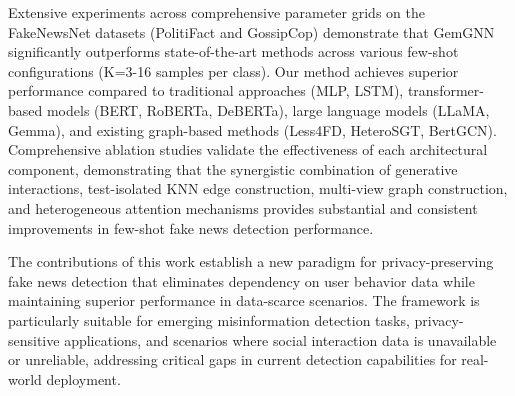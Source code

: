 
Extensive experiments across comprehensive parameter grids on the FakeNewsNet datasets (PolitiFact and GossipCop) demonstrate that GemGNN significantly outperforms state-of-the-art methods across various few-shot configurations (K=3-16 samples per class). Our method achieves superior performance compared to traditional approaches (MLP, LSTM), transformer-based models (BERT, RoBERTa, DeBERTa), large language models (LLaMA, Gemma), and existing graph-based methods (Less4FD, HeteroSGT, BertGCN). Comprehensive ablation studies validate the effectiveness of each architectural component, demonstrating that the synergistic combination of generative interactions, test-isolated KNN edge construction, multi-view graph construction, and heterogeneous attention mechanisms provides substantial and consistent improvements in few-shot fake news detection performance.


The contributions of this work establish a new paradigm for privacy-preserving fake news detection that eliminates dependency on user behavior data while maintaining superior performance in data-scarce scenarios. The framework is particularly suitable for emerging misinformation detection tasks, privacy-sensitive applications, and scenarios where social interaction data is unavailable or unreliable, addressing critical gaps in current detection capabilities for real-world deployment.

\EndAbstract
